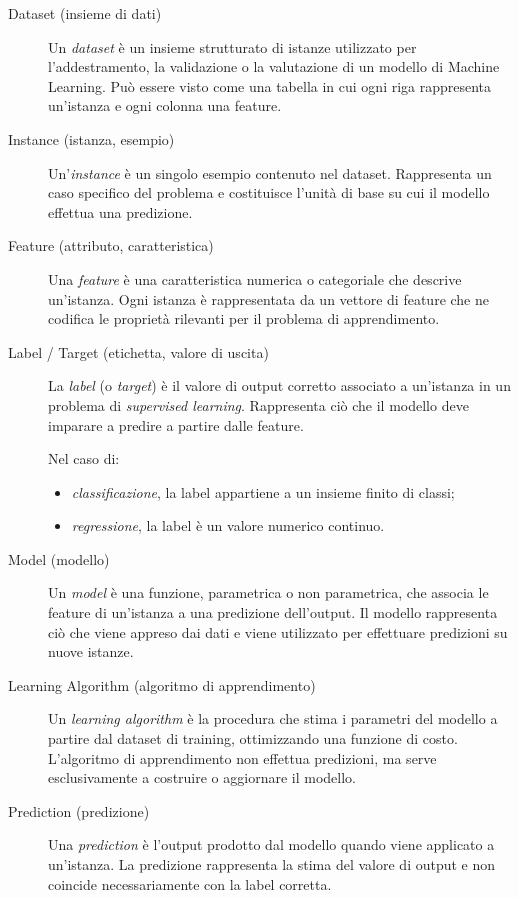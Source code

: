 \documentclass[a4paper,12pt]{report}
\begin{document}
\begin{description}
    \item[Dataset (insieme di dati)]
Un \emph{dataset} è un insieme strutturato di istanze utilizzato per
l’addestramento, la validazione o la valutazione di un modello di Machine Learning.
Può essere visto come una tabella in cui ogni riga rappresenta un’istanza e ogni
colonna una feature.

    \item[Instance (istanza, esempio)]
Un’\emph{instance} è un singolo esempio contenuto nel dataset.
Rappresenta un caso specifico del problema e costituisce l’unità di base su cui
il modello effettua una predizione.

    \item[Feature (attributo, caratteristica)]
Una \emph{feature} è una caratteristica numerica o categoriale che descrive
un’istanza.
Ogni istanza è rappresentata da un vettore di feature che ne codifica le
proprietà rilevanti per il problema di apprendimento.

    \item[Label / Target (etichetta, valore di uscita)]
La \emph{label} (o \emph{target}) è il valore di output corretto associato a
un’istanza in un problema di \emph{supervised learning}.
Rappresenta ciò che il modello deve imparare a predire a partire dalle feature.

Nel caso di:
\begin{itemize}
\item \emph{classificazione}, la label appartiene a un insieme finito di classi;
\item \emph{regressione}, la label è un valore numerico continuo.
\end{itemize}

    \item[Model (modello)]
Un \emph{model} è una funzione, parametrica o non parametrica, che associa
le feature di un’istanza a una predizione dell’output.
Il modello rappresenta ciò che viene appreso dai dati e viene utilizzato
per effettuare predizioni su nuove istanze.

    \item[Learning Algorithm (algoritmo di apprendimento)]
Un \emph{learning algorithm} è la procedura che stima i parametri del modello
a partire dal dataset di training, ottimizzando una funzione di costo.
L’algoritmo di apprendimento non effettua predizioni, ma serve esclusivamente
a costruire o aggiornare il modello.

    \item[Prediction (predizione)]
Una \emph{prediction} è l’output prodotto dal modello quando viene applicato
a un’istanza.
La predizione rappresenta la stima del valore di output e non coincide
necessariamente con la label corretta.


\end{description}
\end{document}
